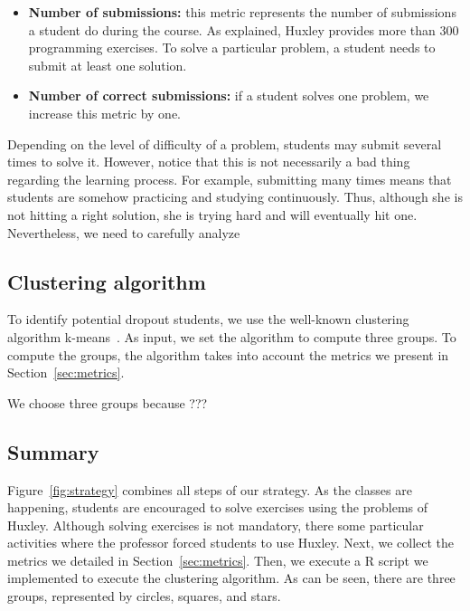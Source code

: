 \begin{itemize}

	\item \textbf{Number of submissions:} this metric represents the number of submissions a student do during the course. As explained, Huxley provides more than 300 programming exercises. To solve a particular problem, a student needs to submit at least one solution.

	\item \textbf{Number of correct submissions:} if a student solves one problem, we increase this metric by one.

\end{itemize}

Depending on the level of difficulty of a problem, students may submit several times to solve it. However, notice that this is not necessarily a bad thing regarding the learning process. For example, submitting many times means that students are somehow practicing and studying continuously. Thus, although she is not hitting a right solution, she is trying hard and will eventually hit one. Nevertheless, we need to carefully analyze \todots


\subsection{Clustering algorithm}

To identify potential dropout students, we use the well-known clustering algorithm k-means~\cite{}. As input, we set the algorithm to compute three groups. To compute the groups, the algorithm takes into account the metrics we present in Section~\ref{sec:metrics}.

We choose three groups because ???



\subsection{Summary}

Figure~\ref{fig:strategy} combines all steps of our strategy. As the classes are happening, students are encouraged to solve exercises using the problems of Huxley. Although solving exercises is not mandatory, there some particular activities where the professor forced students to use Huxley. Next, we collect the metrics we detailed in Section~\ref{sec:metrics}. Then, we execute a R script we implemented to execute the clustering algorithm. As can be seen, there are three groups, represented by circles, squares, and stars. 

